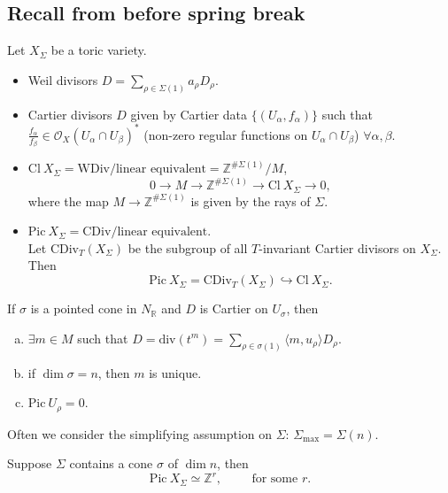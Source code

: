 \documentclass[a4paper,12pt]{amsart}
\newcommand{\ZZ}{\mathbb{Z}}
\newcommand{\RR}{\mathbb{R}}
\newcommand{\OO}{\ensuremath{\mathcal{O}}}
\newcommand{\divof}[1]{\mathrm{div}(#1)}
\newcommand{\CDiv}{\mathrm{CDiv}}
\newcommand{\Picard}{\mathrm{Pic}~}
\newcommand{\Cl}{\mathrm{Cl}~}
\begin{document}
\subsection{Recall from before spring break}
Let $X_{\Sigma}$ be a toric variety.
\begin{itemize}
	\item Weil divisors $D=\sum_{\rho\in\Sigma(1)}a_{\rho}D_{\rho}$.
	\item Cartier divisors $D$ given by Cartier data $\{(U_\alpha,f_\alpha)\}$ such that $\frac{f_\alpha}{f_\beta}\in\OO_X(U_\alpha\cap U_\beta)^{*}$ (non-zero regular functions on $U_\alpha\cap U_\beta$) $\forall\alpha,\beta$.
	\item $\Cl X_{\Sigma}=\text{WDiv}/\text{linear equivalent}=\ZZ^{\#\Sigma(1)}/M$,
	\begin{equation*}
		0\rightarrow M\rightarrow\ZZ^{\#\Sigma(1)}\rightarrow\Cl X_{\Sigma}\rightarrow 0,
	\end{equation*}
	where the map $M\to\ZZ^{\#\Sigma(1)}$ is given by the rays of $\Sigma$.
	\item $\Picard X_{\Sigma}=\CDiv/\text{linear equivalent}$.\\
	Let $\CDiv_{T}(X_{\Sigma})$ be the subgroup of all $T$-invariant Cartier divisors on $X_{\Sigma}$. Then
	\begin{equation*}
		\Picard X_{\Sigma}=\CDiv_{T}(X_{\Sigma})\hookrightarrow \Cl X_{\Sigma}.
	\end{equation*}
\end{itemize}
\begin{Proposition}
	If $\sigma$ is a pointed cone in $N_{\RR}$ and $D$ is Cartier on $U_\sigma$, then
	\begin{enumerate}[(a)]
		\item $\exists m\in M$ such that $D=\divof{t^m}=\sum_{\rho\in\sigma(1)}\langle m,u_{\rho}\rangle D_{\rho}$.
		\item if $\dim\sigma=n$, then $m$ is unique.
		\item $\Picard U_{\rho}=0$.
	\end{enumerate}
\end{Proposition}
\begin{remark}
	Often we consider the simplifying assumption on $\Sigma$: $\Sigma_{\max}=\Sigma(n)$.
\end{remark}
\begin{Proposition}
	Suppose $\Sigma$ contains a cone $\sigma$ of $\dim n$, then
	\begin{equation*}
		\Picard X_{\Sigma}\simeq\ZZ^{r},\hspace{1cm}\text{for some }r.
	\end{equation*}
\end{Proposition}
\end{document}
